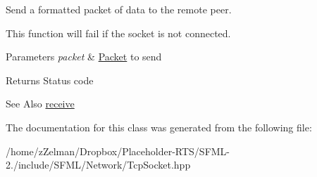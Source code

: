 Send a formatted packet of data to the remote peer. 

This function will fail if the socket is not connected.


\begin{DoxyParams}{Parameters}
{\em packet} & \hyperlink{classsf_1_1Packet}{Packet} to send\\
\hline
\end{DoxyParams}
\begin{DoxyReturn}{Returns}
Status code
\end{DoxyReturn}
\begin{DoxySeeAlso}{See Also}
\hyperlink{classsf_1_1TcpSocket_a90ce50811ea61d4f00efc62bb99ae1af}{receive} 
\end{DoxySeeAlso}


The documentation for this class was generated from the following file\-:\begin{DoxyCompactItemize}
\item 
/home/z\-Zelman/\-Dropbox/\-Placeholder-\/\-R\-T\-S/\-S\-F\-M\-L-\/2./include/\-S\-F\-M\-L/\-Network/Tcp\-Socket.\-hpp\end{DoxyCompactItemize}
